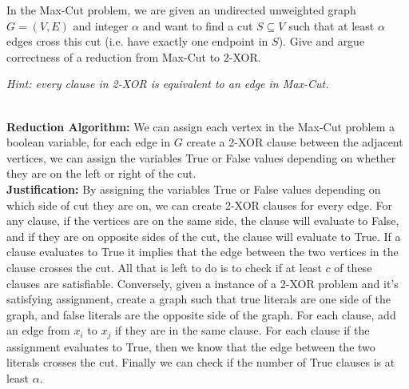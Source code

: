 \documentclass[11pt]{article}
\begin{document}
\begin{subparts}
\subpart In the Max-Cut problem, we are given an undirected unweighted graph $G=(V, E)$ and integer $\alpha$ and want to find a cut $S \subseteq V$ such that at least $\alpha$ edges cross this cut (i.e. have exactly one endpoint in $S$). Give and argue correctness of a reduction from Max-Cut to $2$-XOR.

\emph{Hint: every clause in 2-XOR is equivalent to an edge in Max-Cut.}\\
\begin{solution}\\
    \textbf{Reduction Algorithm: } We can assign each vertex in the Max-Cut problem a boolean variable, for each edge in $G$ create a
    2-XOR clause between the adjacent vertices, we can assign the variables True or False values depending on whether they are on 
    the left or right of the cut.\\
    \textbf{Justification: }By assigning the variables True or False values depending on which side of 
    cut they are on, we can create 2-XOR clauses for every edge. For any clause, if the vertices are on the same
    side, the clause will evaluate to False, and if they are on opposite sides of the cut, the clause will 
    evaluate to True. If a clause evaluates to True it implies that the edge between the two vertices in the clause crosses the cut.
    All that is left to do is to check if at least $c$ of these clauses are satisfiable. Conversely, given a instance of a 2-XOR problem and 
    it's satisfying assignment, create a graph such that true literals are one side of the graph, and false literals are the opposite side 
    of the graph. For each clause, add an edge from $x_i$ to $x_j$ if they are in the same clause. For each clause if the assignment evaluates to 
    True, then we know that the edge between the two literals crosses the cut. Finally we can check if the number of 
    True clauses is at least $\alpha$. 
\end{solution}


\end{subparts}
\end{document}
